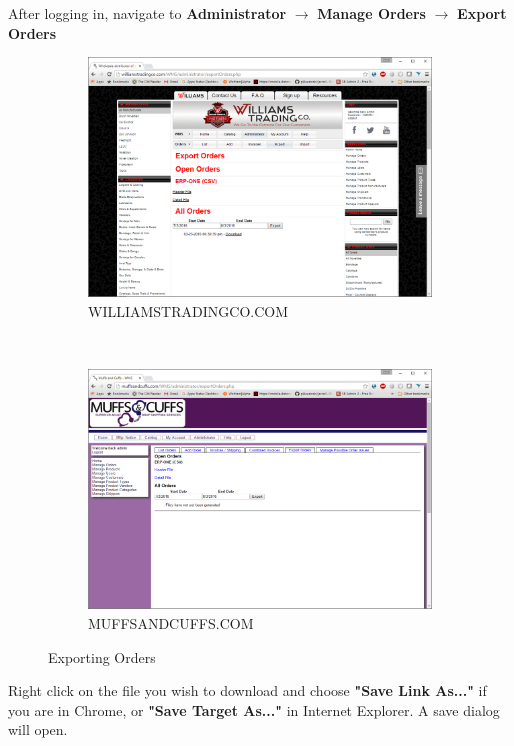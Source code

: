 After logging in, navigate to \textbf{Administrator} $\rightarrow$ \textbf{Manage Orders} $\rightarrow$ \textbf{Export Orders}


\begin{figure}[H]
	\centering
	\begin{subfigure}[b]{0.4\textwidth}
		\includegraphics[width=\textwidth]{../img/image49}
		\caption{{\tiny WILLIAMSTRADINGCO.COM}}
	\end{subfigure}
	~
	\begin{subfigure}[b]{0.4\textwidth}
		\includegraphics[width=\textwidth]{../img/image50}
		\caption{{\tiny MUFFSANDCUFFS.COM}}
	\end{subfigure}
	\caption{Exporting Orders}
\end{figure}

Right click on the file you wish to download and choose \textbf{"Save Link As..."} if you are in Chrome, or \textbf{"Save Target As..."} in Internet Explorer. A save dialog will open. 

